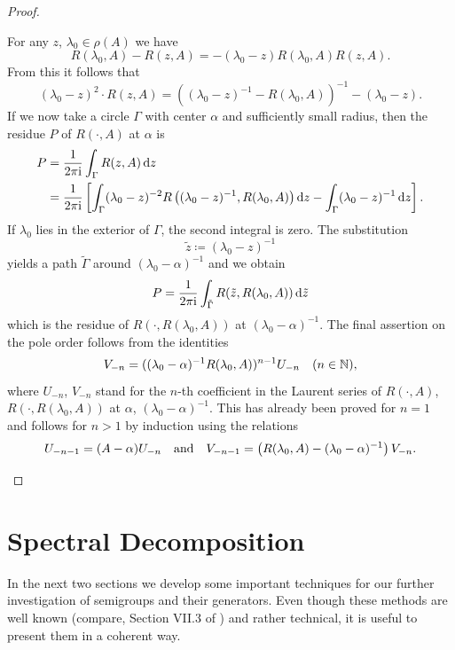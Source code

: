 \begin{proof}
\begin{enumerate}[\upshape (i), wide, labelindent=.25em]
For any $z$,  $\lambda_{0} \in \rho(A)$ we have 
%
\[
R(\lambda_{0},A) - R(z,A)= -(\lambda_{0}-z)R(\lambda_{0},A)R(z,A) .
\]
%
From this it follows that 
%
\[
	(\lambda_{0}-z)^2\cdot R(z,A) = \left((\lambda_{0}-z)^{-1}-R(\lambda_{0},A)\right)^{-1} - (\lambda_{0}-z) .
\]
%
If we now take a circle $\Gamma$ with center $\alpha$ and sufficiently small radius, then the residue $P$ of\/ $R(\cdot,A)$ at $\alpha$ is
\begin{align*}
P &=  \frac{1}{2\pi\mathrm{i} } \int_{\Gamma} R(z,A)   \mathop{}\!\mathrm{d}{z} \\
&=  \frac{1}{2\pi\mathrm{i} } \left[\int_{\Gamma} (\lambda_{0}-z)^{-2}R\left((\lambda_{0}-z)^{-1}, R(\lambda_{0},A)\right)  \mathop{}\!\mathrm{d}{z}   - 
   \int_{\Gamma}(\lambda_{0}-z)^{-1} \mathop{}\!\mathrm{d}{z} \right] . 
\end{align*} 
If\/ $\lambda_{0}$ lies in the exterior of\/ $\Gamma$, the second integral is zero.
The substitution 
%
\[
	 \tilde{z} \coloneq (\lambda_{0} - z)^{-1} 
\]
%
yields a path $\tilde{\Gamma}$ around $(\lambda_{0}-\alpha)^{-1}$ and we obtain
\[
P = \frac{1}{2\pi\mathrm{i} } \int_{\tilde{\Gamma}} R(\tilde{z},R(\lambda_{0},A)) \, \mathrm{d}\tilde{z}
\]
which is the residue of\/ $R(\cdot,R(\lambda_{0},A))$ at $(\lambda_{0}-\alpha)^{-1}$.
The final assertion on the pole order follows from the identities
\[
V_{-n} = ((\lambda_{0}-\alpha)^{-1}R(\lambda_{0},A))^{n-1}U_{-n} \quad (n \in \mathbb{N}) ,
\]
where $U_{- n}$, \resp $V_{- n}$ stand for the $ n $-th coefficient in the Laurent series of\/ $R(\cdot,A)$, \resp $R(\cdot,R(\lambda_{0},A))$ at $\alpha$, \resp $(\lambda_{0}-\alpha)^{-1}$.
This has already been proved for $n = 1$ and follows for $n > 1$ by induction using the relations
\begin{equation*}
U_{-n-1} = (A - \alpha)U_{-n} 
\quad \text{and} \quad 
V_{-n-1} = \left(R(\lambda_{0},A) - (\lambda_{0}-\alpha)^{-1}\right)V_{-n} .
\qedhere
\end{equation*}
\end{enumerate}
\end{proof}
\section{Spectral Decomposition}\label{sec:a3-3}%
In the next two sections we develop some important techniques for our further investigation of semigroups and their generators.
Even though these methods are well known (compare, \eg Section VII.3 of \textcite{dunfordschwartz:1958}) and rather technical, it is useful to present them in a coherent way.

